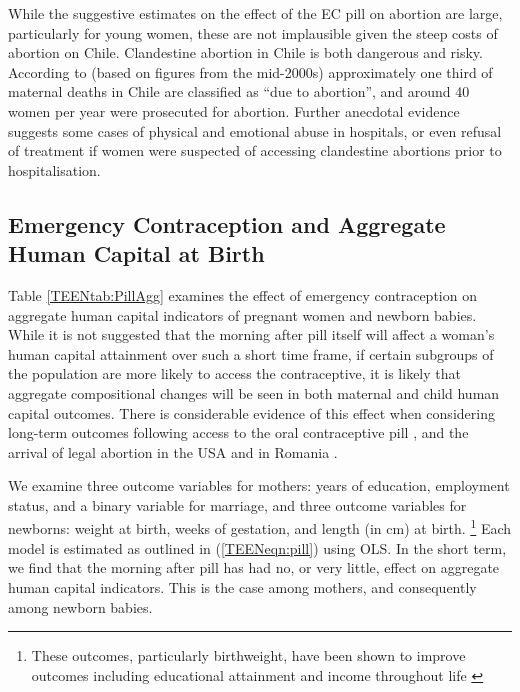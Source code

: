 While the suggestive estimates on the effect of the EC pill on abortion are 
large, particularly for young women, these are not implausible given the steep 
costs of abortion on Chile.  Clandestine abortion in Chile is both dangerous and
risky.  According to \citet{ShepardCasas2007} (based on figures from the 
mid-2000s) approximately one third of maternal deaths in Chile are classified as 
``due to abortion'', and around 40 women per year were prosecuted for abortion.
Further anecdotal evidence suggests some cases of physical and emotional abuse 
in hospitals, or even refusal of treatment if women were suspected of accessing 
clandestine abortions prior to hospitalisation.

\subsection{Emergency Contraception and Aggregate Human Capital at Birth}
Table \ref{TEENtab:PillAgg} examines the effect of emergency contraception on
aggregate human capital indicators of pregnant women and newborn babies.  While
it is not suggested that the morning after pill itself will affect a woman's
human capital attainment over such a short time frame, if certain subgroups of 
the population are more likely to access the contraceptive, it is likely that 
aggregate compositional changes will be seen in both maternal and child human 
capital outcomes.  There is considerable evidence of this effect when considering
long-term outcomes following access to the oral contraceptive pill 
\citep{Baileyetal2012,OltmansHungerman2012}, and the arrival of legal abortion 
\citep{Whitaker2011,Ananatetal2009} in the USA and in Romania
\citep{PopEleches2006}.

We examine three outcome variables for mothers: years of education, employment 
status, and a binary variable for marriage, and three outcome variables for 
newborns: weight at birth, weeks of gestation, and length (in cm) at birth.%
\footnote{These outcomes, particularly birthweight, have been shown to improve 
outcomes including educational attainment and income throughout life 
\citep{BehrmanRosenzweig2004}}  Each model is estimated as outlined in 
(\ref{TEENeqn:pill}) using OLS.  In the short term, we find that the morning 
after pill has had no, or very little, effect on aggregate human capital 
indicators. This is the case among mothers, and consequently among newborn 
babies.


